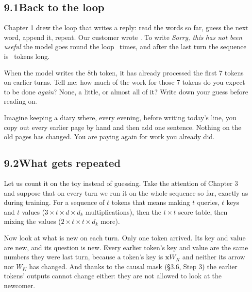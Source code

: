 \subsection*{9.1\quad Back to the loop}

Chapter 1 drew the loop that writes a reply: read the words so far, guess the next word, append it,
repeat. Our customer wrote . To write \emph{Sorry, this has not been useful} the
model goes round the loop \nNineSteps\ times, and after the last turn the sequence is \nNineFinalT\ tokens long.

\Predict When the model writes the 8th token, it has already processed the first 7 tokens on earlier
turns. Tell me: how much of the work for those 7 tokens do you expect to be done \emph{again}? None, a
little, or almost all of it? Write down your guess before reading on.

\Picture Imagine keeping a diary where, every evening, before writing today's line, you copy out every
earlier page by hand and then add one sentence. Nothing on the old pages has changed. You are paying again
for work you already did.


\subsection*{9.2\quad What gets repeated}

Let us count it on the toy instead of guessing. Take the attention of Chapter 3 and suppose that on every
turn we run it on the whole sequence so far, exactly as during training. For a sequence of $t$ tokens that
means making $t$ queries, $t$ keys and $t$ values ($3 \times t \times d \times d_k$ multiplications), then
the $t \times t$ score table, then mixing the values ($2 \times t \times t \times d_k$ more).

Now look at what is new on each turn. Only one token arrived. Its key and value are new, and its question
is new. Every earlier token's key and value are the same numbers they were last turn, because a token's
key is $\bm{x}W_K$ and neither its arrow nor $W_K$ has changed. And thanks to the causal mask (\S3.6, Step 3)
the earlier tokens' outputs cannot change either: they are not allowed to look at the newcomer.

